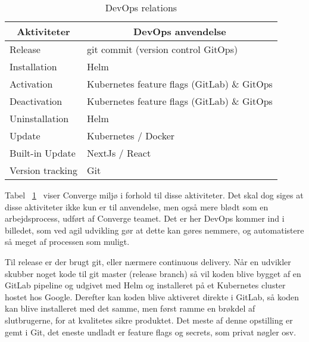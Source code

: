 \begin{table}[H]
    \begin{small}
        \caption{DevOps relations}
        \label{tab:devops-relation}
        \begin{center}
            \begin{tabular}[c]{l|l}
                \multicolumn{1}{c|}{\textbf{Aktiviteter}} & 
                \multicolumn{1}{c}{\textbf{DevOps anvendelse}} \\
                \hline
                Release & git commit (version control GitOps) \\
                Installation & Helm \\
                Activation & Kubernetes feature flags  (GitLab) \& GitOps \\
                Deactivation & Kubernetes feature flags (GitLab) \& GitOps \\
                Uninstallation & Helm\\
                Update & Kubernetes / Docker ~\cite{documentation_terms}\\
                Built-in Update & NextJs / React \\
                Version tracking & Git \\
            \end{tabular}
        \end{center}
    \end{small}
\end{table}

Tabel ~\ref{tab:devops-relation}~\cite{documentation_terms} viser Converge miljø i forhold til disse aktiviteter. Det skal dog siges at disse aktiviteter ikke kun er til anvendelse, men også mere blødt som en arbejdsprocess, udført af Converge teamet. Det er her DevOps kommer ind i billedet, som ved agil udvikling gør at dette kan gøres nemmere, og automatistere så meget af processen som muligt.

Til release er der brugt git, eller nærmere continuous delivery. Når en udvikler skubber noget kode til git master (release branch) så vil koden blive bygget af en GitLab pipeline og udgivet med Helm og installeret på et Kubernetes cluster hostet hos Google. Derefter kan koden blive aktiveret direkte i GitLab, så koden kan blive installeret med det samme, men først ramme en brøkdel af slutbrugerne, for at kvalitetes sikre produktet. Det meste af denne opstilling er gemt i Git, det eneste undladt er feature flags  og secrets, som privat nøgler osv.

